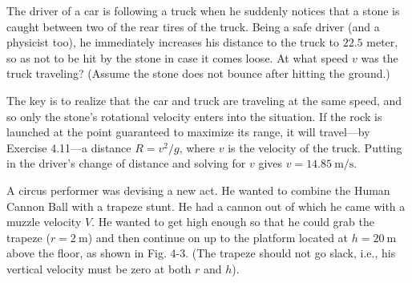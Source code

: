 \documentclass[../feynman-lectures-on-physics.tex]{subfiles}
\begin{document}
\begin{questions}
\begin{solution}
  \end{solution}

	\question The driver of a car is following a truck when he suddenly notices that a stone is caught between two of the rear tires of the truck. Being a safe driver (and a physicist too), he immediately increases his distance to the truck to $22.5$ meter, so as not to be hit by the stone in case it comes loose. At what speed $v$ was the truck traveling? (Assume the stone does not bounce after hitting the ground.)

    \begin{solution}
      The key is to realize that the car and truck are traveling at the same
      speed, and so only the stone's rotational velocity enters into the
      situation. If the rock is launched at the point
      guaranteed to maximize its range, it will travel---by Exercise 4.11---a
      distance $R = v^2/g$, where $v$ is the velocity of the truck. Putting in
      the driver's change of distance and solving for $v$ gives $v = \SI{14.85}{\meter\per\second}$.
    \end{solution}

	\question A circus performer was devising a new act. He wanted to combine the Human Cannon Ball with a trapeze stunt. He had a cannon out of which he came with a muzzle velocity $V$. He wanted to get high enough so that he could grab the trapeze ($r = \SI{2}{\meter}$) and then continue on up to the platform located at $h = \SI{20}{\meter}$ above the floor, as shown in Fig. 4-3. (The trapeze should not go slack, i.e., his vertical velocity must be zero at both $r$ and $h$).
    \begin{parts}

\end{parts}
\end{questions}
\end{document}
